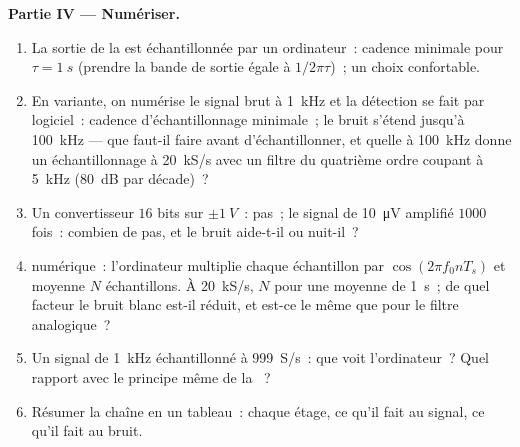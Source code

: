 \begin{problem}
\medskip
\noindent\textbf{Partie IV --- Numériser.}
\begin{enumerate}[resume]
  \item La sortie de la  est échantillonnée par un ordinateur~: cadence minimale pour
        $\tau = \qty{1}{s}$ (prendre la bande de sortie égale à $1/2\pi\tau$)~; un
        choix confortable.
  \item En variante, on numérise le signal brut à \qty{1}{kHz} et la
        détection se fait par logiciel~: cadence d'échantillonnage minimale~; le bruit
        s'étend jusqu'à \qty{100}{kHz} --- que faut-il faire avant d'échantillonner,
        et quelle  à \qty{100}{kHz} donne un échantillonnage à
        \qty{20}{kS/s} avec un filtre du quatrième ordre coupant à \qty{5}{kHz}
        (\qty{80}{dB} par décade)~?
  \item Un convertisseur $16$ bits sur $\pm\qty{1}{V}$~: pas~; le signal de \qty{10}{\micro V}
        amplifié $1000$ fois~: combien de pas, et le bruit aide-t-il ou nuit-il~?
  \item {} numérique~: l'ordinateur multiplie chaque échantillon par
        $\cos(2\pi f_0nT_s)$ et moyenne $N$ échantillons. À \qty{20}{kS/s},
        $N$ pour une moyenne de \qty{1}{s}~; de quel facteur le bruit blanc est-il
        réduit, et est-ce le même que pour le filtre analogique~?
  \item Un signal de \qty{1}{kHz} échantillonné à \qty{999}{S/s}~: que voit
        l'ordinateur~? Quel rapport avec le principe même de la ~?
  \item Résumer la chaîne en un tableau~: chaque étage, ce qu'il fait au
        signal, ce qu'il fait au bruit.
\end{enumerate}
\end{problem}

